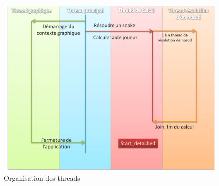 \begin{figure}[h]
 \centering
 \includegraphics[scale=0.4,keepaspectratio=true]{img/threads.png}
 \caption{Organisation des threads}
 \label{threads}
\end{figure}
